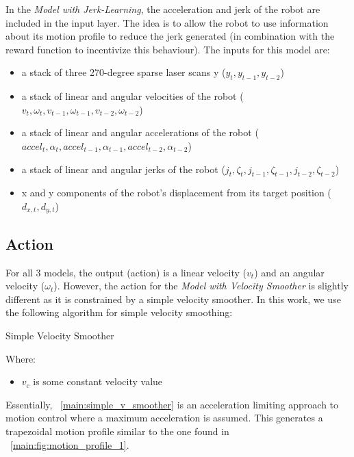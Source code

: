 In the \textit{Model with Jerk-Learning}, the acceleration and jerk of the robot are included in the input layer. The idea is to allow the robot to use information about its motion profile to reduce the jerk generated (in combination with the reward function to incentivize this behaviour). The inputs for this model are:
\begin{itemize}
\item a stack of three 270-degree sparse laser scans y ($y_{t}, y_{t-1}, y_{t-2}$)
\item a stack of linear and angular velocities of the robot ($v_{t}, \omega_{t}, v_{t-1}, \omega_{t-1}, v_{t-2}, \omega_{t-2}$)
\item a stack of linear and angular accelerations of the robot ($accel_{t}, \alpha_{t}, accel_{t-1}, \alpha_{t-1}, accel_{t-2}, \alpha_{t-2}$)
\item a stack of linear and angular jerks of the robot ($j_{t}, \zeta_{t}, j_{t-1}, \zeta_{t-1}, j_{t-2}, \zeta_{t-2}$)
\item x and y components of the robot's displacement from its target position ($d_{x,t}, d_{y,t}$)
\end{itemize}

\subsection{Action}
For all 3 models, the output (action) is a linear velocity ($v_t$) and an angular velocity ($\omega_{t}$). However, the action for the \textit{Model with Velocity Smoother} is slightly different as it is constrained by a simple velocity smoother. In this work, we use the following algorithm for simple velocity smoothing:

\begin{algorithm}[H]
\caption{Simple Velocity Smoother}
\label{main:simple_v_smoother}
\end{algorithm}
Where:
\begin{itemize}
\item $v_c$ is some constant velocity value
\end{itemize}

Essentially, ~\autoref{main:simple_v_smoother} is an acceleration limiting approach to motion control where a maximum acceleration is assumed. This generates a trapezoidal motion profile similar to the one found in ~\autoref{main:fig:motion_profile_1}. 


